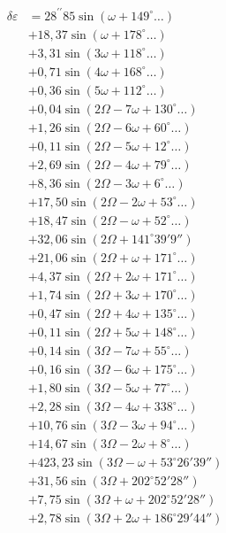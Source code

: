 \documentclass[10pt,a4paper]{article}
\begin{document}
\begin{align*}
\delta\varepsilon &= 28^{\prime\prime}85 \sin(\omega + 149^{\circ}\ldots) \\
&+ 18,37 \sin(\omega + 178^{\circ}\ldots) \\
&+ 3,31 \sin(3\omega + 118^{\circ}\ldots) \\
&+ 0,71 \sin(4\omega + 168^{\circ}\ldots) \\
&+ 0,36 \sin(5\omega + 112^{\circ}\ldots) \\
&+ 0,04 \sin(2\Omega - 7\omega + 130^{\circ}\ldots) \\
&+ 1,26 \sin(2\Omega - 6\omega + 60^{\circ}\ldots) \\
&+ 0,11 \sin(2\Omega - 5\omega + 12^{\circ}\ldots) \\
&+ 2,69 \sin(2\Omega - 4\omega + 79^{\circ}\ldots) \\
&+ 8,36 \sin(2\Omega - 3\omega + 6^{\circ}\ldots) \\
&+ 17,50 \sin(2\Omega - 2\omega + 53^{\circ}\ldots) \\
&+ 18,47 \sin(2\Omega - \omega + 52^{\circ}\ldots) \\
&+ 32,06 \sin(2\Omega + 141^{\circ}39'9'') \\
&+ 21,06 \sin(2\Omega + \omega + 171^{\circ}\ldots) \\
&+ 4,37 \sin(2\Omega + 2\omega + 171^{\circ}\ldots) \\
&+ 1,74 \sin(2\Omega + 3\omega + 170^{\circ}\ldots) \\
&+ 0,47 \sin(2\Omega + 4\omega + 135^{\circ}\ldots) \\
&+ 0,11 \sin(2\Omega + 5\omega + 148^{\circ}\ldots) \\
&+ 0,14 \sin(3\Omega - 7\omega + 55^{\circ}\ldots) \\
&+ 0,16 \sin(3\Omega - 6\omega + 175^{\circ}\ldots) \\
&+ 1,80 \sin(3\Omega - 5\omega + 77^{\circ}\ldots) \\
&+ 2,28 \sin(3\Omega - 4\omega + 338^{\circ}\ldots) \\
&+ 10,76 \sin(3\Omega - 3\omega + 94^{\circ}\ldots) \\
&+ 14,67 \sin(3\Omega - 2\omega + 8^{\circ}\ldots) \\
&+ 423,23 \sin(3\Omega - \omega + 53^{\circ}26'39'') \\
&+ 31,56 \sin(3\Omega + 202^{\circ}52'28'') \\
&+ 7,75 \sin(3\Omega + \omega + 202^{\circ}52'28'') \\
&+ 2,78 \sin(3\Omega + 2\omega + 186^{\circ}29'44'') \\

\end{align*}
\end{document}
